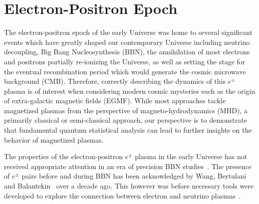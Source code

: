 \documentclass[universe,article,submit,moreauthors,pdftex,a4paper]{Definitions/mdpi}
\begin{document}
\section{Electron-Positron Epoch}\label{sec:ElectronPositron}
The electron-positron epoch of the early Universe was home to several significant events which have greatly shaped our contemporary Universe including neutrino decoupling, Big Bang Nucleosynthesis (BBN), the annihilation of most electrons and positrons partially re-ionizing the Universe, as well as setting the stage for the eventual recombination period which would generate the cosmic microwave background (CMB). Therefore, correctly describing the dynamics of this $e^{\pm}$ plasma is of interest when considering modern cosmic mysteries such as the origin of extra-galactic magnetic fields (EGMF). While most approaches tackle magnetized plasmas from the perspective of magneto-hydrodynamics (MHD), a primarily classical or semi-classical approach, our perspective is to demonstrate that fundamental quantum statistical analysis can lead to further insights on the behavior of magnetized plasmas.

The properties of the electron-positron $e^{\pm}$ plasma in the early Universe has not received appropriate attention in an era of precision BBN studies~\cite{Pitrou:2018cgg}. The presence of $e^{\pm}$ pairs before and during BBN has been acknowledged by Wang, Bertulani and Balantekin~\cite{Wang:2010px} over a decade ago. This however was before necessary tools were developed to explore the connection between electron and neutrino plasmas~\cite{Mangano:2005cc,Birrell:2012gg,Birrell:2014uka}. 
\end{document}
